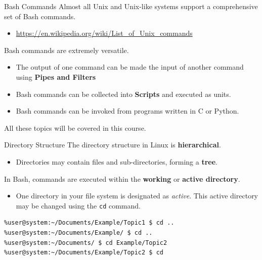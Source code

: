 \documentclass[11pt]{beamer}
\begin{document}
\begin{frame}{Bash Commands}
Almost all Unix and Unix-like systems support a comprehensive set of Bash commands.
\begin{itemize}
\item \url{https://en.wikipedia.org/wiki/List_of_Unix_commands}
\end{itemize}
Bash commands are extremely versatile.
\begin{itemize}
\item The output of one command can be made the input of another command using \textbf{Pipes and Filters}
\item Bash commands can be collected into \textbf{Scripts} and executed as units.
\item Bash commands can be invoked from programs written in C or Python.
\end{itemize}
All these topics will be covered in this course.
\end{frame}

\begin{frame}[fragile=singleslide]{Directory Structure}
The directory structure in Linux is \textbf{hierarchical}.
\begin{itemize}
\item Directories may contain files and sub-directories, forming a \textbf{tree}.  
\end{itemize}
In Bash, commands are executed within the \textbf{working} or \textbf{active directory}.  
\begin{itemize}
\item One directory in your file system is designated as \emph{active}.  This active directory may be changed using the \texttt{cd} command.  
\end{itemize}
\begin{lstlisting}[style=C, language=bash]
%user@system:~/Documents/Example $ cd Topic1
%user@system:~/Documents/Example/Topic1 $ cd ..
%user@system:~/Documents/Example/ $ cd ..
%user@system:~/Documents/ $ cd Example/Topic2
%user@system:~/Documents/Example/Topic2 $ cd 
\end{lstlisting}

\end{frame}
\end{document}

